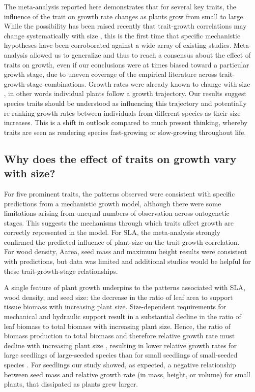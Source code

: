 \documentclass[a4paper,11pt]{article}
\begin{document}
The meta-analysis reported here demonstrates that for several key traits, the influence of the trait on growth rate changes as plants grow from small to large. While the possibility has been raised recently that trait-growth correlations may change systematically with size \citep{Falster:2011ii, Ruger:2012jv, Iida:2014ep, Iida:2014hq}, this is the first time that specific mechanistic hypotheses have been corroborated against a wide array of existing studies. Meta-analysis allowed us to generalize and thus to reach a consensus about the effect of traits on growth, even if our conclusions were at times biased toward a particular growth stage, due to uneven coverage of the empirical literature across trait-growth-stage combinations. Growth rates were already known to change with size \citep{Condit:1993hd, Clark:1999ed, Herault:2011dd}, in other words individual plants follow a growth trajectory. Our results suggest species traits should be understood as influencing this trajectory and potentially re-ranking growth rates between individuals from different species as their size increases. This is a shift in outlook compared to much present thinking, whereby traits are seen as rendering species fast-growing or slow-growing throughout life.

\subsection*{Why does the effect of traits on growth vary with size?}

For five prominent traits, the patterns observed were consistent with specific predictions from a mechanistic growth model, although there were some limitations arising from unequal numbers of observation across ontogenetic stages. This suggests the mechanisms through which traits affect growth are correctly represented in the model. For SLA, the meta-analysis strongly confirmed the predicted influence of plant size on the trait-growth correlation. For wood density, Aarea, seed mass and maximum height results were consistent with predictions, but data was limited and additional studies would be helpful for these trait-growth-stage relationships.

A single feature of plant growth underpins to the patterns associated with SLA, wood density, and seed size: the decrease in the ratio of leaf area to support tissue biomass with increasing plant size. Size-dependent requirements for mechanical and hydraulic support result in a substantial decline in the ratio of leaf biomass to total biomass with increasing plant size. Hence, the ratio of biomass production to total biomass and therefore relative growth rate must decline with increasing plant size \citep{Givnish:1995ta, Enquist:2007ek}, resulting in lower relative growth rates for large seedlings of large-seeded species than for small seedlings of small-seeded species \citep[reviewed by][]{Turnbull:2012ew}. For seedlings our study showed, as expected, a negative relationship between seed mass and relative growth rate (in mass, height, or volume) for small plants, that dissipated as plants grew larger.
\end{document}
